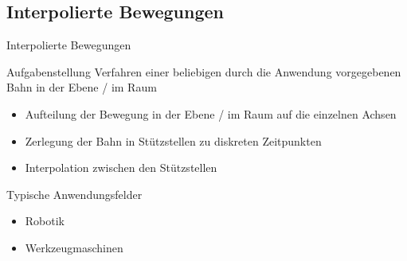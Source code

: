 \subsection[\thesection .\thesubsection \ 
Interpolierte Bewegungen]{Interpolierte Bewegungen}\label{sec:interpolation}
%
\begin{frame}{Interpolierte Bewegungen}
%
\begin{block}{Aufgabenstellung}
%
Verfahren einer beliebigen durch die Anwendung vorgegebenen Bahn in der Ebene
/ im Raum
%
\begin{itemize}
  \item Aufteilung der Bewegung in der Ebene / im Raum auf die einzelnen Achsen
  \item Zerlegung der Bahn in Stützstellen zu diskreten Zeitpunkten
  \item Interpolation zwischen den Stützstellen
\end{itemize}
%
\end{block}
%

\vspace{12pt}

Typische Anwendungsfelder
%
\begin{itemize}
  \item Robotik
  \item Werkzeugmaschinen
\end{itemize}
%


\vspace{36pt}


\end{frame}
%
%
